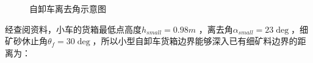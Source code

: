\documentclass{my_paper}
\begin{document}
\begin{figure}[htbp]
    \centering  %

    \caption{自卸车离去角示意图}    %
    \label{liqu}    %
\end{figure}

经查阅资料\cite{che_1,che_2}，小车的货箱最低点高度$h_{small} = 0.98m$ ，离去角$\alpha_{small} =23\deg$，细矿砂休止角$\theta_{f}=30\deg$，所以小型自卸车货箱边界能够深入已有细矿料边界的距离为：
\end{document}

